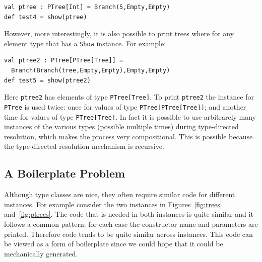 \documentclass[preprint,nocopyrightspace]{sigplanconf}
\begin{document}
\begin{lstlisting}
val ptree : PTree[Int] = Branch(5,Empty,Empty)
def test4 = show(ptree)
\end{lstlisting}

However, more interestingly, it is also possible to print trees where
for any element type that has a \lstinline{Show} instance. For example:

\begin{lstlisting}
val ptree2 : PTree[PTree[Tree]] =
  Branch(Branch(tree,Empty,Empty),Empty,Empty)
def test5 = show(ptree2)
\end{lstlisting}

\noindent Here \lstinline{ptree2} has elements of type
\lstinline{PTree[Tree]}. To print \lstinline{ptree2} the instance for
\lstinline{PTree} is used twice: once for values of type
\lstinline{PTree[PTree[Tree]]}; and another time for values of
type \lstinline{PTree[Tree]}. In fact it is possible to use
arbitrarely many instances of the various types (possible multiple
times) during type-directed resolution, which makes the process very
compositional. This is possible because the type-directed resolution
mechanism is recursive.

\subsection{A Boilerplate Problem}

Although type classes are nice, they often require similar code for
different instances. For example consider the two instances
in Figures~\ref{fig:trees} and~\ref{fig:ptrees}. The code that is
needed in both instances is quite similar and it follows a common
pattern: for each case the constructor name and parameters are
printed. Therefore code tends to be quite similar across instances. This
code can be viewed as a form of boilerplate since we could hope that
it could be mechanically generated.




%
\end{document}
